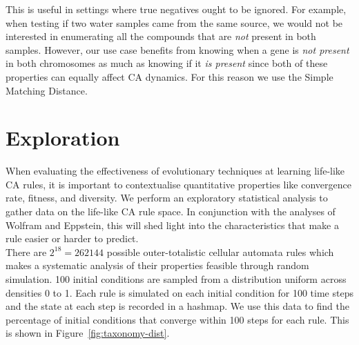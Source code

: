 This is useful in settings where true negatives ought to be ignored. For example, when testing if two water samples came from the same source, we would not be interested in enumerating all the compounds that are \textit{not} present in both samples. However, our use case benefits from knowing when a gene is \textit{not present} in both chromosomes as much as knowing if it \textit{is present} since both of these properties can equally affect CA dynamics. For this reason we use the Simple Matching Distance.

\section{Exploration}

When evaluating the effectiveness of evolutionary techniques at learning life-like CA rules, it is important to contextualise quantitative properties like convergence rate, fitness, and diversity. We perform an exploratory statistical analysis to gather data on the life-like CA rule space. In conjunction with the analyses of Wolfram\cite{wolfram1986theory} and Eppstein\cite{eppstein2010growth}, this will shed light into the characteristics that make a rule easier or harder to predict.\\

There are $2^{18} = 262144$ possible outer-totalistic cellular automata rules which makes a systematic analysis of their properties feasible through random simulation. 100 initial conditions are sampled from a distribution uniform across densities 0 to 1. Each rule is simulated on each initial condition for 100 time steps and the state at each step is recorded in a hashmap. We use this data to find the percentage of initial conditions that converge within 100 steps for each rule. This is shown in Figure~\ref{fig:taxonomy-dist}.

